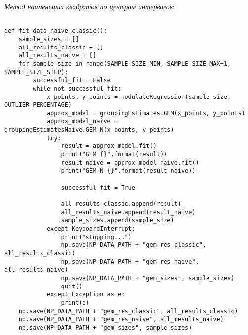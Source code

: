 \textit{Метод наименьших квадратов по центрам интервалов}:
\begin{Verbatim}[fontsize=\scriptsize]

def fit_data_naive_classic():
    sample_sizes = []
    all_results_classic = []
    all_results_naive = []
    for sample_size in range(SAMPLE_SIZE_MIN, SAMPLE_SIZE_MAX+1, SAMPLE_SIZE_STEP):
        successful_fit = False
        while not successful_fit:
            x_points, y_points = modulateRegression(sample_size, OUTLIER_PERCENTAGE)
            approx_model = groupingEstimates.GEM(x_points, y_points)
            approx_model_naive = groupingEstimatesNaive.GEM_N(x_points, y_points)
            try:
                result = approx_model.fit()
                print("GEM {}".format(result))
                result_naive = approx_model_naive.fit()
                print("GEM_N {}".format(result_naive))

                successful_fit = True

                all_results_classic.append(result)
                all_results_naive.append(result_naive)
                sample_sizes.append(sample_size)
            except KeyboardInterrupt:
                print("stopping...")
                np.save(NP_DATA_PATH + "gem_res_classic", all_results_classic)
                np.save(NP_DATA_PATH + "gem_res_naive", all_results_naive)
                np.save(NP_DATA_PATH + "gem_sizes", sample_sizes)
                quit()
            except Exception as e:
                print(e)
    np.save(NP_DATA_PATH + "gem_res_classic", all_results_classic)
    np.save(NP_DATA_PATH + "gem_res_naive", all_results_naive)
    np.save(NP_DATA_PATH + "gem_sizes", sample_sizes)

\end{Verbatim}


